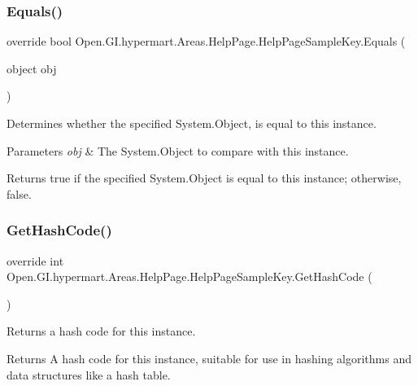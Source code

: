 \subsubsection{\texorpdfstring{Equals()}{Equals()}}
{\footnotesize\ttfamily override bool Open.\+G\+I.\+hypermart.\+Areas.\+Help\+Page.\+Help\+Page\+Sample\+Key.\+Equals (\begin{DoxyParamCaption}\item[{object}]{obj }\end{DoxyParamCaption})}



Determines whether the specified System.\+Object, is equal to this instance. 


\begin{DoxyParams}{Parameters}
{\em obj} & The System.\+Object to compare with this instance.\\
\hline
\end{DoxyParams}
\begin{DoxyReturn}{Returns}
{\ttfamily true} if the specified System.\+Object is equal to this instance; otherwise, {\ttfamily false}. 
\end{DoxyReturn}
\hypertarget{class_open_1_1_g_i_1_1hypermart_1_1_areas_1_1_help_page_1_1_help_page_sample_key_a232891dfae35aa54606577e755c3b3c3}{}\label{class_open_1_1_g_i_1_1hypermart_1_1_areas_1_1_help_page_1_1_help_page_sample_key_a232891dfae35aa54606577e755c3b3c3} 
\subsubsection{\texorpdfstring{Get\+Hash\+Code()}{GetHashCode()}}
{\footnotesize\ttfamily override int Open.\+G\+I.\+hypermart.\+Areas.\+Help\+Page.\+Help\+Page\+Sample\+Key.\+Get\+Hash\+Code (\begin{DoxyParamCaption}{ }\end{DoxyParamCaption})}



Returns a hash code for this instance. 

\begin{DoxyReturn}{Returns}
A hash code for this instance, suitable for use in hashing algorithms and data structures like a hash table. 
\end{DoxyReturn}


